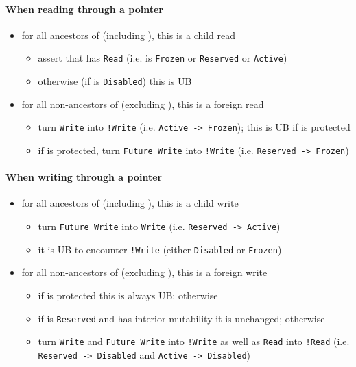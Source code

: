 \documentclass[a4paper,11pt]{article}
\theoremstyle{plain}
\theoremstyle{definition}
\theoremstyle{remark}
\newcommand{\tcode}[1]{\rstinline{#1}}
\newcommand{\tperm}[1]{\texttt{#1}}
\begin{document}
\paragraph*{When reading through a pointer \tcode{y}}
\begin{itemize}
    \item for all ancestors \tcode{x} of \tcode{y} (including \tcode{y}), this is a child read
        \begin{itemize}
            \item assert that \tcode{x} has \tperm{Read} (i.e. is \tperm{Frozen} or \tperm{Reserved} or \tperm{Active})
            \item otherwise (if \tcode{x} is \tperm{Disabled}) this is UB
        \end{itemize}
    \item for all non-ancestors \tcode{z} of \tcode{y} (excluding \tcode{y}), this is a foreign read
        \begin{itemize}
            \item turn \tperm{Write} into \tperm{!Write} (i.e. \tperm{Active -> Frozen}); this is UB if \tcode{z} is protected
            \item if \tcode{z} is protected, turn \tperm{Future Write} into \tperm{!Write} (i.e. \tperm{Reserved -> Frozen})
        \end{itemize}
\end{itemize}

\paragraph*{When writing through a pointer \tcode{y}}
\begin{itemize}
    \item for all ancestors \tcode{x} of \tcode{y} (including \tcode{y}), this is a child write
        \begin{itemize}
            \item turn \tperm{Future Write} into \tperm{Write} (i.e. \tperm{Reserved -> Active})
            \item it is UB to encounter \tperm{!Write} (either \tperm{Disabled} or \tperm{Frozen})
        \end{itemize}
    \item for all non-ancestors \tcode{z} of \tcode{y} (excluding \tcode{y}), this is a foreign write
        \begin{itemize}
            \item if \tcode{z} is protected this is always UB; otherwise
            \item if \tcode{z} is \tperm{Reserved} and has interior mutability it is unchanged; otherwise
            \item turn \tperm{Write} and \tperm{Future Write} into \tperm{!Write} as well as \tperm{Read} into \tperm{!Read}
                (i.e. \tperm{Reserved -> Disabled} and \tperm{Active -> Disabled})
        \end{itemize}
\end{itemize}
\end{document}
